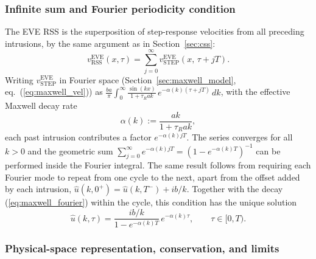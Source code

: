 \documentclass[extra]{gji}
\begin{document}
\subsubsection{Infinite sum and Fourier periodicity condition}

The EVE RSS is the superposition of step-response velocities from all
preceding intrusions, by the same argument as in Section~\ref{sec:css}:
\begin{equation}
  v_{\text{RSS}}^{\text{EVE}}(x,\tau)
  = \sum_{j=0}^{\infty} v_{\text{STEP}}^{\text{EVE}}(x,\,\tau + jT).
\end{equation}
Writing $v_{\text{STEP}}^{\text{EVE}}$ in Fourier space
(Section~\ref{sec:maxwell_model}, eq.~(\ref{eq:maxwell_vel})) as
$\frac{b a}{\pi}\int_0^\infty \frac{\sin(kx)}{1+\tau_R ak}\,e^{-\alpha(k)(\tau+jT)}\,dk$,
with the effective Maxwell decay rate
\begin{equation}
  \alpha(k) := \frac{ak}{1+\tau_R ak},
  \label{eq:alpha_k}
\end{equation}
each past intrusion contributes a factor $e^{-\alpha(k)jT}$.  The series
converges for all $k>0$ and the geometric sum
$\sum_{j=0}^{\infty}e^{-\alpha(k)jT} = (1-e^{-\alpha(k)T})^{-1}$ can be
performed inside the Fourier integral.  The same result follows from requiring each Fourier mode to repeat from
one cycle to the next, apart from the offset added by each intrusion,
$\hat{u}(k,0^+) = \hat{u}(k,T^-) + ib/k$.  Together with the decay
(\ref{eq:maxwell_fourier}) within the cycle, this condition has the unique
solution
\begin{equation}
  \hat{u}(k,\tau) = \frac{ib/k}{1-e^{-\alpha(k)T}}\,e^{-\alpha(k)\tau},
  \qquad \tau\in[0,T).
  \label{eq:maxwell_css_fourier}
\end{equation}

\subsubsection{Physical-space representation, conservation, and limits}
\end{document}
